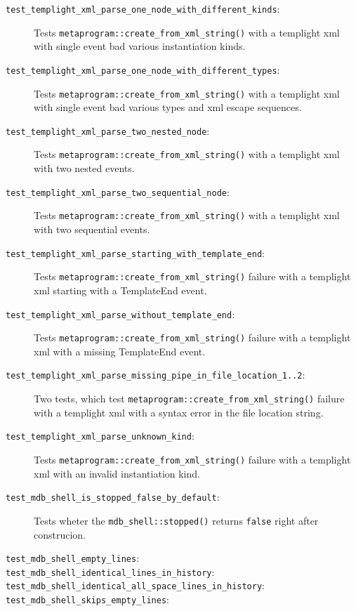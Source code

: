 \begin{description}
    \item[\texttt{test\_templight\_xml\_parse\_one\_node\_with\_different\_kinds}:]
        Tests \texttt{metaprogram::create\_from\_xml\_string()} with a templight
        xml with single event bad various instantiation kinds.
    \item[\texttt{test\_templight\_xml\_parse\_one\_node\_with\_different\_types}:]
        Tests \texttt{metaprogram::create\_from\_xml\_string()} with a templight
        xml with single event bad various types and xml escape sequences.
    \item[\texttt{test\_templight\_xml\_parse\_two\_nested\_node}:]
        Tests \texttt{metaprogram::create\_from\_xml\_string()} with a templight
        xml with two nested events.
    \item[\texttt{test\_templight\_xml\_parse\_two\_sequential\_node}:]
        Tests \texttt{metaprogram::create\_from\_xml\_string()} with a templight
        xml with two sequential events.
    \item[\texttt{test\_templight\_xml\_parse\_starting\_with\_template\_end}:]
        Tests \texttt{metaprogram::create\_from\_xml\_string()} failure with a
        templight xml starting with a TemplateEnd event.
    \item[\texttt{test\_templight\_xml\_parse\_without\_template\_end}:]
        Tests \texttt{metaprogram::create\_from\_xml\_string()} failure with a
        templight xml with a missing TemplateEnd event.
    \item[\texttt{test\_templight\_xml\_parse\_missing\_pipe\_in\_file\_location\_1..2}:]
        Two tests, which test \texttt{metaprogram::create\_from\_xml\_string()}
        failure with a templight xml with a syntax error in the file location
        string.
    \item[\texttt{test\_templight\_xml\_parse\_unknown\_kind}:]
        Tests \texttt{metaprogram::create\_from\_xml\_string()} failure with a
        templight xml with an invalid instantiation kind.
    \item[\texttt{test\_mdb\_shell\_is\_stopped\_false\_by\_default}:]
        Tests wheter the \texttt{mdb\_shell::stopped()} returns \texttt{false}
        right after construcion.
    \item[\texttt{test\_mdb\_shell\_empty\_lines}:]
    \item[\texttt{test\_mdb\_shell\_identical\_lines\_in\_history}:]
    \item[\texttt{test\_mdb\_shell\_identical\_all\_space\_lines\_in\_history}:]
    \item[\texttt{test\_mdb\_shell\_skips\_empty\_lines}:]

\end{description}
